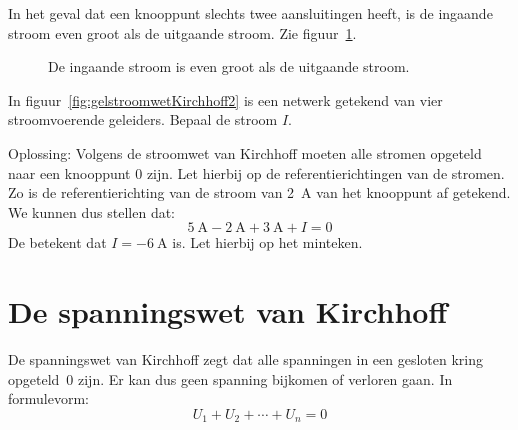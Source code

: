 In het geval dat een knooppunt slechts twee aansluitingen heeft, is de ingaande stroom even groot als de
uitgaande stroom. Zie figuur~\ref{fig:gelingaandeIisuitgaandeI}.

\begin{figure}[!ht]
\centering
{}
\caption{De ingaande stroom is even groot als de uitgaande stroom.}
\label{fig:gelingaandeIisuitgaandeI}
\end{figure}

\begin{example}
In figuur~\ref{fig:gelstroomwetKirchhoff2} is een netwerk getekend van vier stroomvoerende geleiders.
Bepaal de stroom $I$.
\begin{center}
\centering
{}
\label{fig:gelstroomwetKirchhoff2}
\end{center}
Oplossing: Volgens de stroomwet van Kirchhoff moeten alle stromen opgeteld naar een knooppunt 0 zijn.
Let hierbij op de referentierichtingen van de stromen. Zo is de referentierichting van de stroom van
\SI{2}{\ampere} van het knooppunt af getekend. We kunnen dus stellen dat:
\begin{equation}
\SI{5}{\ampere} - \SI{2}{\ampere} + \SI{3}{\ampere} + I = 0
\end{equation}
De betekent dat $I = \SI{-6}{\ampere}$ is. Let hierbij op het minteken.
\end{example}


\section{De spanningswet van Kirchhoff}
De spanningswet van Kirchhoff zegt dat alle spanningen in een gesloten kring opgeteld~0
zijn. Er kan dus geen spanning bijkomen of verloren gaan. In formulevorm:
%
\begin{equation}
U_1 + U_2 + \cdots + U_n = 0
\end{equation}

